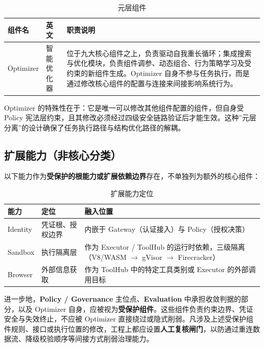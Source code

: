 \begin{table}[htbp]
\centering
\caption{元层组件}
\label{tab:meta-component}
\begin{tabular}{@{}llp{8cm}@{}}
\toprule
\textbf{组件名} & \textbf{英文} & \textbf{职责说明} \\
\midrule
Optimizer & 智能优化器 & 位于九大核心组件之上，负责驱动自我重长循环；集成搜索与优化模块，负责组件调参、动态组合、行为策略学习及受约束的新组件生成。Optimizer 自身不参与任务执行，而是通过修改核心组件的配置与连接来间接影响系统行为。 \\
\bottomrule
\end{tabular}
\end{table}

Optimizer 的特殊性在于：它是唯一可以修改其他组件配置的组件，但自身受 Policy 宪法层约束，且其修改必须经过四级安全链路验证后才能生效。这种”元层分离”的设计确保了任务执行路径与结构优化路径的解耦。

\subsection{扩展能力（非核心分类）}

以下能力作为\textbf{受保护的根能力或扩展依赖边界}存在，不单独列为额外的核心组件：

\begin{table}[htbp]
\centering
\caption{扩展能力定位}
\label{tab:extension-capabilities}
\begin{tabular}{@{}llp{7cm}@{}}
\toprule
\textbf{能力} & \textbf{定位} & \textbf{融入位置} \\
\midrule
Identity & 凭证根、授权边界 & 内嵌于 Gateway（认证接入）与 Policy（授权决策） \\
Sandbox & 执行隔离层 & 作为 Executor / ToolHub 的运行时依赖，三级隔离（V8/WASM $\to$ gVisor $\to$ Firecracker） \\
Browser & 外部信息获取 & 作为 ToolHub 中的特定工具类别或 Executor 的外部调用目标 \\
\bottomrule
\end{tabular}
\end{table}

进一步地，\textbf{Policy / Governance} 主位点、\textbf{Evaluation} 中承担收敛判据的部分，以及 Optimizer 自身，应被视为\textbf{受保护组件}。这些组件负责约束边界、凭证安全与失效终止，不应被 Optimizer 直接绕过或隐式削弱。凡涉及上述受保护组件规则、接口或执行位置的修改，工程上都应设置\textbf{人工复核闸门}，以防通过重连数据流、降级校验顺序等间接方式削弱治理能力。

